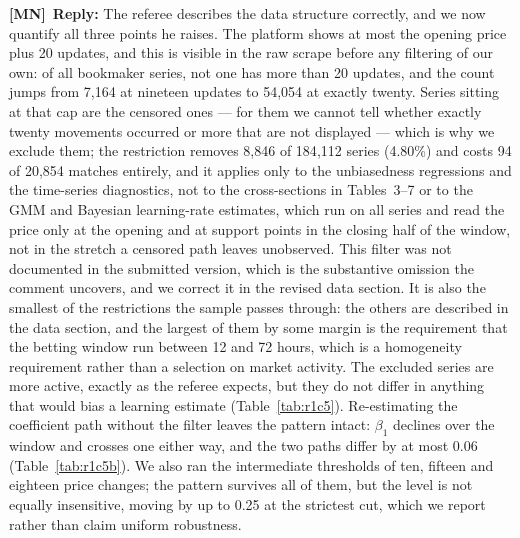 \documentclass[letterpaper,12pt]{article}
\newcounter{b}
\newcommand{\ReplyMN}[1]{\par\noindent%
  \textcolor{mncol}{\textbf{[MN]}}~\textbf{Reply:} #1}
\begin{document}
\begin{enumerate}
\ReplyMN{The referee describes the data structure correctly, and we now quantify all three points he raises. The platform shows at most the opening price plus 20 updates, and this is visible in the raw scrape before any filtering of our own: of all bookmaker series, not one has more than 20 updates, and the count jumps from 7{,}164 at nineteen updates to 54{,}054 at exactly twenty. Series sitting at that cap are the censored ones --- for them we cannot tell whether exactly twenty movements occurred or more that are not displayed --- which is why we exclude them; the restriction removes 8{,}846 of 184{,}112 series (4.80\%) and costs 94 of 20{,}854 matches entirely, and it applies only to the unbiasedness regressions and the time-series diagnostics, not to the cross-sections in Tables~3--7 or to the GMM and Bayesian learning-rate estimates, which run on all series and read the price only at the opening and at support points in the closing half of the window, not in the stretch a censored path leaves unobserved. This filter was not documented in the submitted version, which is the substantive omission the comment uncovers, and we correct it in the revised data section. It is also the smallest of the restrictions the sample passes through: the others are described in the data section, and the largest of them by some margin is the requirement that the betting window run between 12 and 72 hours, which is a homogeneity requirement rather than a selection on market activity. The excluded series are more active, exactly as the referee expects, but they do not differ in anything that would bias a learning estimate (Table~\ref{tab:r1c5}). Re-estimating the coefficient path without the filter leaves the pattern intact: $\beta_1$ declines over the window and crosses one either way, and the two paths differ by at most 0.06 (Table~\ref{tab:r1c5b}). We also ran the intermediate thresholds of ten, fifteen and eighteen price changes; the pattern survives all of them, but the level is not equally insensitive, moving by up to 0.25 at the strictest cut, which we report rather than claim uniform robustness.

}
\end{enumerate}
\end{document}
